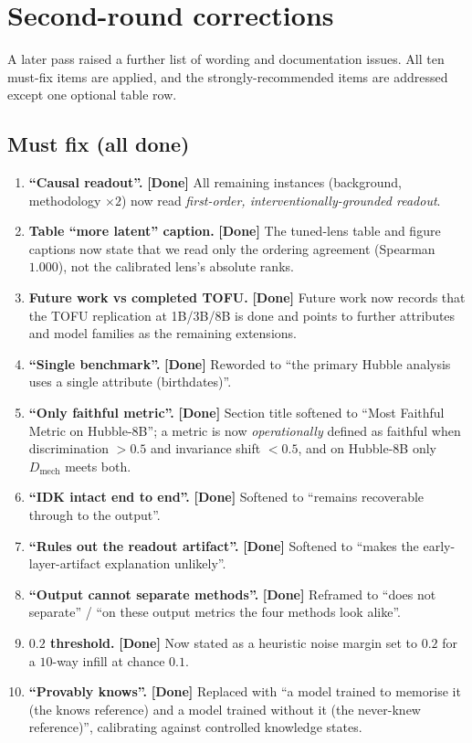 \documentclass[11pt,a4paper]{article}
\newcommand{\dmech}{\ensuremath{D_{\text{mech}}}}
\newcommand{\done}{\textbf{\textcolor{black!80}{[Done]}}}
\begin{document}
\section{Second-round corrections}
A later pass raised a further list of wording and documentation issues. All ten must-fix items are applied,
and the strongly-recommended items are addressed except one optional table row.

\subsection*{Must fix (all done)}
\begin{enumerate}[label=\arabic*.]
\item \textbf{``Causal readout''.} \done{} All remaining instances (background, methodology $\times2$) now
read \emph{first-order, interventionally-grounded readout}.
\item \textbf{Table ``more latent'' caption.} \done{} The tuned-lens table and figure captions now state
that we read only the ordering agreement (Spearman $1.000$), not the calibrated lens's absolute ranks.
\item \textbf{Future work vs completed TOFU.} \done{} Future work now records that the TOFU replication at
1B/3B/8B is done and points to further attributes and model families as the remaining extensions.
\item \textbf{``Single benchmark''.} \done{} Reworded to ``the primary Hubble analysis uses a single
attribute (birthdates)''.
\item \textbf{``Only faithful metric''.} \done{} Section title softened to ``Most Faithful Metric on
Hubble-8B''; a metric is now \emph{operationally} defined as faithful when discrimination $>0.5$ and
invariance shift $<0.5$, and on Hubble-8B only \dmech{} meets both.
\item \textbf{``IDK intact end to end''.} \done{} Softened to ``remains recoverable through to the output''.
\item \textbf{``Rules out the readout artifact''.} \done{} Softened to ``makes the early-layer-artifact
explanation unlikely''.
\item \textbf{``Output cannot separate methods''.} \done{} Reframed to ``does not separate'' / ``on these
output metrics the four methods look alike''.
\item \textbf{$0.2$ threshold.} \done{} Now stated as a heuristic noise margin set to $0.2$ for a $10$-way
infill at chance $0.1$.
\item \textbf{``Provably knows''.} \done{} Replaced with ``a model trained to memorise it (the knows
reference) and a model trained without it (the never-knew reference)'', calibrating against controlled
knowledge states.
\end{enumerate}
\end{document}
